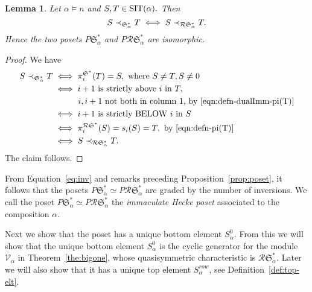 \documentclass[12pt,letterpaper]{amsart}
\newtheorem{lemma}[theorem]{Lemma}
\theoremstyle{definition}
\newcommand{\poIcover}{\prec_{{\mathfrak{S}}^\ast _\alpha}}
\newcommand{\dI}{\mathfrak{S}^*}
\newcommand{\rdI}{\mathcal{R}\mathfrak{S}^*}
\begin{document}
\begin{lemma}\label{lem:sameposet} Let $\alpha\vDash n$ and $S,T\in \operatorname{SIT}(\alpha).$ Then 
\[S\poIcover  T \iff S\poRIcover  T.\]
Hence  the two posets $P\dI_\alpha$ and $P\rdI_\alpha$ are isomorphic.
\end{lemma}
\begin{proof} We have 
\begin{align*} S\poIcover  T&\iff \pi_i^{\dI}(T)=S, \text{ where }S\ne T, S\ne 0\\
& \iff i+1 \text{ is strictly above $i$ in } T, \\ 
& \qquad\quad i, i+1 \text{ not both in column 1, by } \eqref{eqn:defn-dualImm-pi(T)}\\
&\iff i+1 \text{ is strictly BELOW $i$ in } S\\
&\iff \pi_i^{\rdI} (S)=s_i(S)=T, \text{ by } \eqref{eqn:defn-pi(T)}\\
&\iff S\poRIcover  T.
\end{align*}
The claim follows.
\end{proof}

From  Equation~\eqref{eq:inv} and remarks preceding Proposition~\ref{prop:poset}, it follows that the posets $P\dI_\alpha\simeq P\rdI_\alpha$ are graded by the number of inversions. We call the poset $P\dI_\alpha\simeq P\rdI_\alpha$ the \emph{immaculate Hecke poset} associated to the composition $\alpha$.

Next we show that the poset has a unique bottom element $S_\alpha^0$. 
From this we will show that the unique bottom element $S_\alpha^0$ is the cyclic generator for the module $\mathcal{V}_\alpha$ in   Theorem~\ref{the:bigone}, whose quasisymmetric characteristic is $\rdI_\alpha.$  Later we will also show that it has a unique top element $S^{row}_\alpha$, see Definition~\ref{def:top-elt}.
\end{document}

